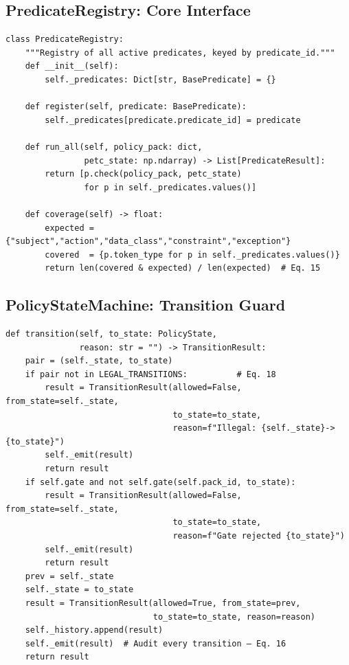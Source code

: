 \documentclass[12pt,letterpaper]{article}
\theoremstyle{definition}
\theoremstyle{remark}
\begin{document}
\subsection{PredicateRegistry: Core Interface}

\begin{noteboxtc}
\begin{lstlisting}[style=pythonstyle, caption={PredicateRegistry — registration and coverage metric}, label={lst:registry}]
class PredicateRegistry:
    """Registry of all active predicates, keyed by predicate_id."""
    def __init__(self):
        self._predicates: Dict[str, BasePredicate] = {}

    def register(self, predicate: BasePredicate):
        self._predicates[predicate.predicate_id] = predicate

    def run_all(self, policy_pack: dict,
                petc_state: np.ndarray) -> List[PredicateResult]:
        return [p.check(policy_pack, petc_state)
                for p in self._predicates.values()]

    def coverage(self) -> float:
        expected = {"subject","action","data_class","constraint","exception"}
        covered  = {p.token_type for p in self._predicates.values()}
        return len(covered & expected) / len(expected)  # Eq. 15
\end{lstlisting}
\end{noteboxtc}

\subsection{PolicyStateMachine: Transition Guard}

\begin{noteboxtc}
\begin{lstlisting}[style=pythonstyle, caption={PolicyStateMachine.transition() with audit emission}, label={lst:statemachine}]
def transition(self, to_state: PolicyState,
               reason: str = "") -> TransitionResult:
    pair = (self._state, to_state)
    if pair not in LEGAL_TRANSITIONS:          # Eq. 18
        result = TransitionResult(allowed=False, from_state=self._state,
                                  to_state=to_state,
                                  reason=f"Illegal: {self._state}->{to_state}")
        self._emit(result)
        return result
    if self.gate and not self.gate(self.pack_id, to_state):
        result = TransitionResult(allowed=False, from_state=self._state,
                                  to_state=to_state,
                                  reason=f"Gate rejected {to_state}")
        self._emit(result)
        return result
    prev = self._state
    self._state = to_state
    result = TransitionResult(allowed=True, from_state=prev,
                              to_state=to_state, reason=reason)
    self._history.append(result)
    self._emit(result)  # Audit every transition — Eq. 16
    return result
\end{lstlisting}
\end{noteboxtc}
\end{document}

